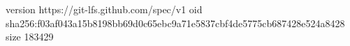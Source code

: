 version https://git-lfs.github.com/spec/v1
oid sha256:f03af043a15b8198bb69d0c65ebc9a71e5837cbf4de5775cb687428e524a8428
size 183429

